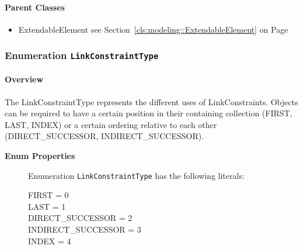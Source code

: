 \paragraph{Parent Classes}
\begin{itemize}
\item ExtendableElement see Section~\ref{cls:modeling::ExtendableElement} on Page~\pageref{cls:modeling::ExtendableElement}\end{itemize}
\subsubsection{\Large{Enumeration \bfseries \texttt{LinkConstraintType}\normalfont}}
\label{cls:modeling::patterns::LinkConstraintType} 
\paragraph{Overview}
	
			
The LinkConstraintType represents the different uses of LinkConstraints. Objects can be required to have a certain position in their containing collection (FIRST, LAST, INDEX) or a certain ordering relative to each other (DIRECT\_SUCCESSOR, INDIRECT\_SUCCESSOR).	
		
	


\begin{description}

	\item[\textbf{Enum Properties}] Enumeration \texttt{LinkConstraintType} has the following literals:

	\begin{description}
		
		\item[FIRST = 0]
		\hspace{\fill}
		\nopagebreak

		\item[LAST = 1]
		\hspace{\fill}
		\nopagebreak

		\item[DIRECT\_SUCCESSOR = 2]
		\hspace{\fill}
		\nopagebreak

		\item[INDIRECT\_SUCCESSOR = 3]
		\hspace{\fill}
		\nopagebreak

		\item[INDEX = 4]
		\hspace{\fill}
		\nopagebreak
 
	\end{description}

\end{description}



